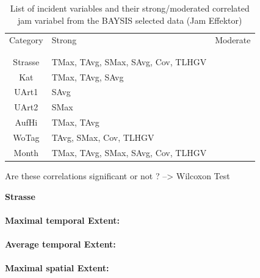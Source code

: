 \noindent
\begin{table}[h!]
	\centering
	\begin{tabular}{c|l|l}  
		Category & Strong & Moderate \\
		\\[-1em]
		\hline
		\\[-1em]
		Strasse & TMax, TAvg, SMax, SAvg, Cov, TLHGV & \\ 
 		Kat & TMax, TAvg, SAvg & \\ 
 		UArt1 & SAvg & \\
 		UArt2 & SMax & \\
 		AufHi & TMax, TAvg & \\
 		WoTag & TAvg, SMax, Cov, TLHGV & \\
 		Month & TMax, TAvg, SMax, SAvg, Cov, TLHGV & \\
	\end{tabular}
	\caption{List of incident variables and their strong/moderated correlated jam variabel from the BAYSIS selected data (Jam Effektor)}
\end{table}

Are these correlations significant or not ? --> Wilcoxon Test

\large
\centerline{\textbf{Strasse}}
\normalsize

\paragraph{Maximal temporal Extent:}
\paragraph{Average temporal Extent:}
\paragraph{Maximal spatial Extent:}
